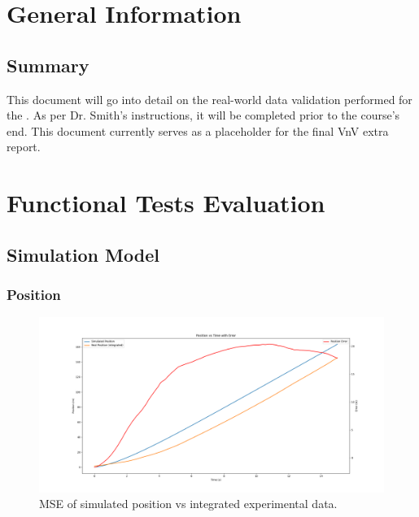 \documentclass[12pt, titlepage]{article}
\begin{document}

\section{General Information}

\subsection{Summary}

\noindent This document will go into detail on the real-world data validation performed for the \progname{}. As per Dr. Smith's instructions, it will be completed prior to the course's end. This document currently serves as a placeholder for the final VnV extra report.

\section{Functional Tests Evaluation}

\subsection{Simulation Model}

\subsubsection{Position}

\begin{figure}[H]
  \begin{center}
   \includegraphics[width=\textwidth]{MSE Graphs/position.png}
  \caption{MSE of simulated position vs integrated experimental data.}
  \label{Fig_Position} 
  \end{center}
\end{figure}
\end{document}
